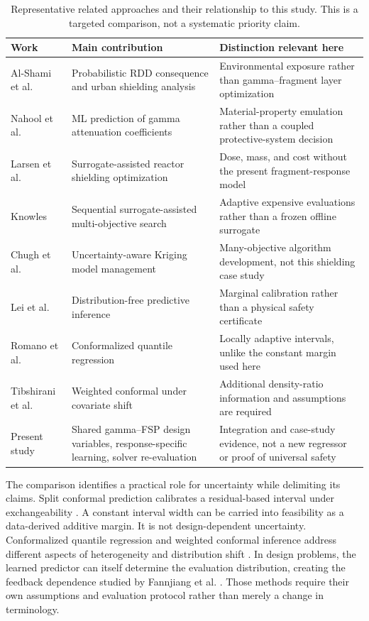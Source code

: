 \documentclass[12pt]{elsarticle}
\begin{document}
\begin{table}[H]
\centering\small
\caption{Representative related approaches and their relationship to this study. This is a targeted comparison, not a systematic priority claim.}\label{tab:related}
\begin{tabular}{@{}p{.25\linewidth}p{.32\linewidth}p{.35\linewidth}@{}}
\toprule Work & Main contribution & Distinction relevant here \\\midrule
Al-Shami et al. \cite{AlShami2026} & Probabilistic RDD consequence and urban shielding analysis & Environmental exposure rather than gamma--fragment layer optimization \\
Nahool et al. \cite{Nahool2024GammaML} & ML prediction of gamma attenuation coefficients & Material-property emulation rather than a coupled protective-system decision \\
Larsen et al. \cite{Larsen2024Shielding} & Surrogate-assisted reactor shielding optimization & Dose, mass, and cost without the present fragment-response model \\
Knowles \cite{Knowles2006ParEGO} & Sequential surrogate-assisted multi-objective search & Adaptive expensive evaluations rather than a frozen offline surrogate \\
Chugh et al. \cite{Chugh2018KRVEA} & Uncertainty-aware Kriging model management & Many-objective algorithm development, not this shielding case study \\
Lei et al. \cite{Lei2018Conformal} & Distribution-free predictive inference & Marginal calibration rather than a physical safety certificate \\
Romano et al. \cite{Romano2019CQR} & Conformalized quantile regression & Locally adaptive intervals, unlike the constant margin used here \\
Tibshirani et al. \cite{Tibshirani2019Shift} & Weighted conformal under covariate shift & Additional density-ratio information and assumptions are required \\
Present study & Shared gamma--FSP design variables, response-specific learning, solver re-evaluation & Integration and case-study evidence, not a new regressor or proof of universal safety \\
\bottomrule
\end{tabular}
\end{table}

The comparison identifies a practical role for uncertainty while delimiting its claims. Split conformal prediction calibrates a residual-based interval under exchangeability \cite{Vovk2005Conformal,Lei2018Conformal}. A constant interval width can be carried into feasibility as a data-derived additive margin. It is not design-dependent uncertainty. Conformalized quantile regression and weighted conformal inference address different aspects of heterogeneity and distribution shift \cite{Romano2019CQR,Tibshirani2019Shift}. In design problems, the learned predictor can itself determine the evaluation distribution, creating the feedback dependence studied by Fannjiang et al. \cite{Fannjiang2022Design}. Those methods require their own assumptions and evaluation protocol rather than merely a change in terminology.
\end{document}
